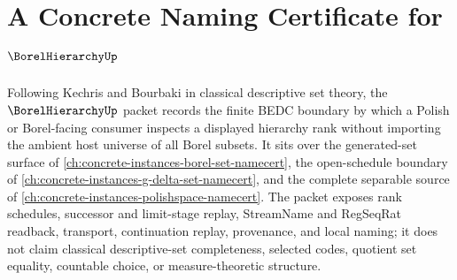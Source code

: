 \chapter{A Concrete Naming Certificate for $\BorelHierarchyUp$}
\label{ch:concrete-instances-borel-hierarchy-namecert}

Following Kechris and Bourbaki in classical descriptive set theory, the $\BorelHierarchyUp$ packet records the finite BEDC boundary by which a Polish or Borel-facing consumer inspects a displayed hierarchy rank without importing the ambient host universe of all Borel subsets. It sits over the generated-set surface of \autoref{ch:concrete-instances-borel-set-namecert}, the open-schedule boundary of \autoref{ch:concrete-instances-g-delta-set-namecert}, and the complete separable source of \autoref{ch:concrete-instances-polishspace-namecert}. The packet exposes rank schedules, successor and limit-stage replay, StreamName and RegSeqRat readback, transport, continuation replay, provenance, and local naming; it does not claim classical descriptive-set completeness, selected codes, quotient set equality, countable choice, or measure-theoretic structure.

